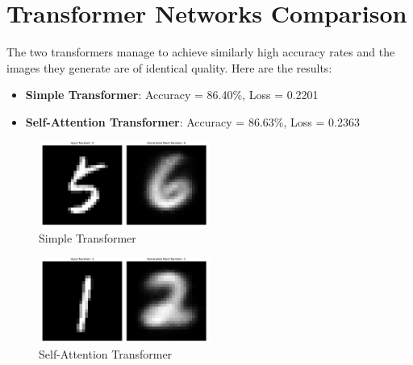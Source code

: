 \documentclass[lettersize,journal]{IEEEtran}
\begin{document}
\section{Transformer Networks Comparison}
The two transformers manage to achieve similarly high accuracy rates and the images they generate
are of identical quality. Here are the results:
\begin{itemize}
    \item \textbf{Simple Transformer}: Accuracy = 86.40\%, Loss = 0.2201
    \item \textbf{Self-Attention Transformer}: Accuracy = 86.63\%, Loss = 0.2363 
\end{itemize}
\begin{figure}[H]   
    \centering
    \includegraphics[width=0.5\textwidth]{media/Simple.png}
    \caption{Simple Transformer}
\end{figure}
\begin{figure}[H]   
    \centering
    \includegraphics[width=0.5\textwidth]{media/Self_Attention.png}
    \caption{Self-Attention Transformer}
\end{figure}

\end{document}
